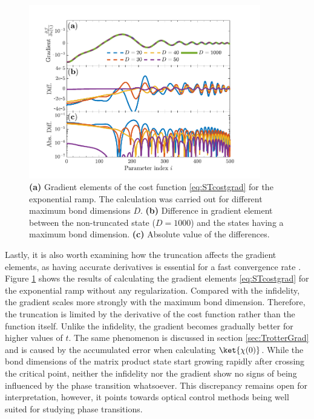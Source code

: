\begin{figure}[h!]
    \centering
    \includegraphics[width=0.9\textwidth]{Figures/L20/GradientTruncation.pdf}
    \caption{ \textbf{(a)} Gradient elements of the cost function \eqref{eq:STcostgrad} for the exponential ramp. The calculation was carried out for different maximum bond dimensions $D$. \textbf{(b)} Difference in gradient element between the non-truncated state ($D = 1000$) and the states having a maximum bond dimension. \textbf{(c)} Absolute value of the differences. }
    \label{fig:GradientTruncation}
\end{figure}
Lastly, it is also worth examining how the truncation affects the gradient elements, as having accurate derivatives is essential for a fast convergence rate \cite{deFouquieres2011}. Figure \ref{fig:GradientTruncation} shows the results of calculating the gradient elements \eqref{eq:STcostgrad} for the exponential ramp without any regularization. Compared with the infidelity, the gradient scales more strongly with the maximum bond dimension. Therefore, the truncation is limited by the derivative of the cost function rather than the function itself. Unlike the infidelity, the gradient becomes gradually better for higher values of $t$. The same phenomenon is discussed in section \ref{sec:TrotterGrad} and is caused by the accumulated error when calculating $\ket{\chi (0)}$. 
While the bond dimensions of the matrix product state start growing rapidly after crossing the critical point, neither the infidelity nor the gradient show no signs of being influenced by the phase transition whatsoever. This discrepancy remains open for interpretation, however, it points towards optical control methods being well suited for studying phase transitions. 